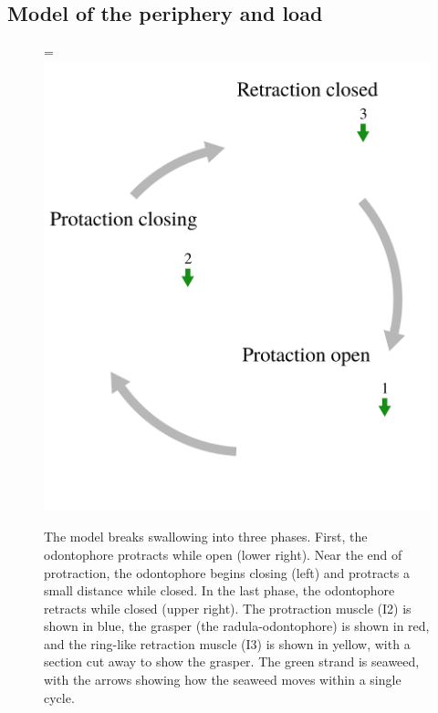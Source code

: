 \subsection{Model of the periphery and load}
\label{sec:periphery_model}
\begin{figure}
    \centering
    \ifthesis
        \linewidth
    \else
        \figwidth=\linewidth
    \fi
    \includegraphics[width=\figwidth]{diagrams/model_storyboard}
    \caption[Phases of swallowing behavior in the model]{
         The model breaks swallowing into three phases.
         First, the odontophore protracts while open (lower right).
         Near the end of protraction, the odontophore begins closing
         (left) and protracts a small distance while closed.  In the last
         phase, the odontophore retracts while closed (upper right).
         The protraction muscle (I2) is shown in blue, the grasper
         (the radula-odontophore) is shown in red, and the
         ring-like retraction muscle (I3) is shown in yellow,
         with a section cut away to show the grasper.  The green
         strand is seaweed, with the arrows showing how the seaweed moves
         within a single cycle.}
    \label{fig:model_storyboard}
\end{figure}
